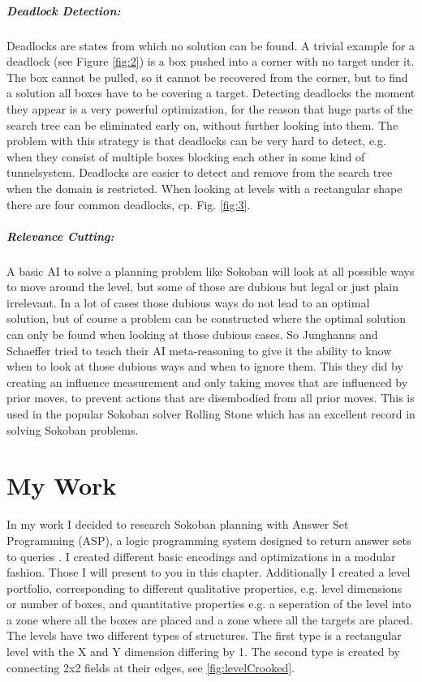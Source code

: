 \documentclass{report}
\begin{document}
\paragraph{Deadlock Detection:} Deadlocks are states from which no solution can be found. A trivial example for a deadlock (see Figure \ref{fig:2}) is a box pushed into a corner with no target under it. The box cannot be pulled, so it cannot be recovered from the corner, but to find a solution all boxes have to be covering a target.
Detecting deadlocks the moment they appear is a very powerful optimization, for the reason that huge parts of the search tree can be eliminated early on, without further looking into them. The problem with this strategy is that deadlocks can be very hard to detect, e.g. when they consist of multiple boxes blocking each other in some kind of tunnelsystem. Deadlocks are easier to detect and remove from the search tree when the domain is restricted. When looking at levels with a rectangular shape there are four common deadlocks, cp. Fig. \ref{fig:3}.
\paragraph{Relevance Cutting:} A basic AI to solve a planning problem like Sokoban will look at all possible ways to move around the level, but some of those are dubious but legal or just plain irrelevant. In a lot of cases those dubious ways do not lead to an optimal solution, but of course a problem can be constructed where the optimal solution can only be found when looking at those dubious cases. So Junghanns and Schaeffer tried to teach their AI meta-reasoning to give it the ability to know when to look at those dubious ways and when to ignore them. This they did by creating an influence measurement and only taking moves that are influenced by prior moves, to prevent actions that are disembodied from all prior moves. This is used in the popular Sokoban solver Rolling Stone which has an excellent record in solving Sokoban problems.
\chapter{My Work}
In my work I decided to research Sokoban planning with Answer Set Programming (ASP), a logic programming system designed to return answer sets to queries \cite{LifschitzASP}. I created different basic encodings and optimizations in a modular fashion. Those I will present to you in this chapter. Additionally I created a level portfolio, corresponding to different qualitative properties, e.g. level dimensions or number of boxes, and quantitative properties e.g. a seperation of the level into a zone where all the boxes are placed and a zone where all the targets are placed. The levels have two different types of structures. The first type is a rectangular level with the X and Y dimension differing by 1. The second type is created by connecting 2x2 fields at their edges, see \ref{fig:levelCrooked}.
\cite{BoteaHeuristicsVsPlanning} \cite{Dor1999SOKOBANAO} \cite{Froleyks2017UsingAA} \cite{SokoRelevanceCuts}
\end{document}

